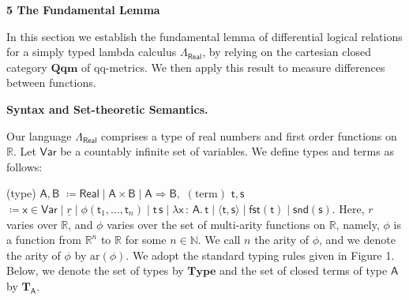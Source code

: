 \documentclass[10pt,a4paper]{amsart}
\providecommand{\coloneq}{\coloneqq}
\begin{document}
 
 
 


 
\par\medskip\noindent\textbf{5 The Fundamental Lemma}\par
 
 
In this section we establish the fundamental lemma of differential logical relations for a simply typed lambda calculus $\Lambda_{\mathsf{Real}}$, by relying on the cartesian closed category $\mathbf{Qqm}$ of qq-metrics. We then apply this result to measure differences between functions.\par
 
 
 
\par\medskip\noindent\textbf{Syntax and Set-theoretic Semantics.}\par
 
 
Our language $\Lambda_{\mathsf{Real}}$ comprises a type of real numbers and first order functions on $\mathbb{R}$. Let $\mathsf{Var}$ be a countably infinite set of variables. We define types and terms as follows:\par
    (type) $\displaystyle\mathsf{A},\mathsf{B}$ $\displaystyle\coloneq\mathsf{Real}\mid\mathsf{A}\times\mathsf{B}\mid\mathsf{A}%
\Rightarrow\mathsf{B},$     $\displaystyle(\text{term})$ $\displaystyle\mathsf{t},\mathsf{s}$ $\displaystyle\coloneq\mathsf{x}\in\mathsf{Var}\mid\underline{r}\mid\phi(%
\mathsf{t}_{1},\ldots,\mathsf{t}_{n})\mid\mathsf{t}\,\mathsf{s}\mid\lambda%
\mathsf{x}\,{:}\,\mathsf{A}.\,\mathsf{t}\mid\langle\mathsf{t},\mathsf{s}%
\rangle\mid\mathsf{fst}(\mathsf{t})\mid\mathsf{snd}(\mathsf{s}).$    
Here, $r$ varies over $\mathbb{R}$, and $\phi$ varies over the set of multi-arity functions on $\mathbb{R}$, namely, $\phi$ is a function from $\mathbb{R}^{n}$ to $\mathbb{R}$ for some $n\in\mathbb{N}$. We call $n$ the arity of $\phi$, and we denote the arity of $\phi$ by $\mathrm{ar}(\phi)$. We adopt the standard typing rules given in Figure 1. Below, we denote the set of types by $\mathbf{Type}$ and the set of closed terms of type $\mathsf{A}$ by $\mathbf{T}_{\mathsf{A}}$.\par
 
\end{document}
